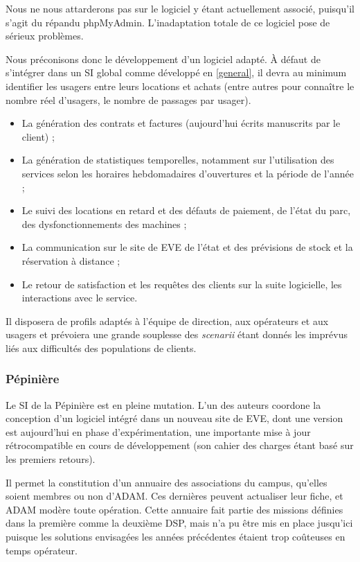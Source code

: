 Nous ne nous attarderons pas sur le logiciel y étant actuellement associé,
puisqu'il s'agit du répandu phpMyAdmin. L'inadaptation totale de ce logiciel
pose de sérieux problèmes.

Nous préconisons donc le développement d'un logiciel adapté. À défaut
de s'intégrer dans un SI global comme développé en \ref{general}, il
devra au minimum identifier les usagers entre leurs locations et achats
(entre autres pour connaître le nombre réel d'usagers, le nombre de passages
par usager).

\begin{itemize}
\item La génération des contrats et factures (aujourd'hui écrits manuscrits
      par le client) ;
\item La génération de statistiques temporelles, notamment sur l'utilisation
      des services selon les horaires hebdomadaires d'ouvertures et
      la période de l'année ;
\item Le suivi des locations en retard et des défauts de paiement, de l'état
      du parc, des dysfonctionnements des machines ;
\item La communication sur le site de EVE de l'état et des prévisions de
      stock et la réservation à distance ;
\item Le retour de satisfaction et les requêtes des clients sur la suite
      logicielle, les interactions avec le service.
\end{itemize}

Il disposera de profils adaptés à l'équipe de direction, aux opérateurs et
aux usagers et prévoiera une grande souplesse des \textit{scenarii} étant
donnés les imprévus liés aux difficultés des populations de clients.

\subsubsection{Pépinière}

Le SI de la Pépinière est en pleine mutation. L'un des auteurs coordone
la conception d'un logiciel intégré dans un nouveau site de EVE, dont une version
est aujourd'hui en phase d'expérimentation, une importante mise à jour
rétrocompatible en cours de développement (son cahier des charges étant basé
sur les premiers retours).

Il permet la constitution d'un annuaire des associations du campus, qu'elles
soient membres ou non d'ADAM. Ces dernières peuvent actualiser leur fiche,
et ADAM modère toute opération. Cette annuaire fait partie des missions définies
dans la première comme la deuxième DSP, mais n'a pu être mis en place jusqu'ici
puisque les solutions envisagées les années précédentes étaient trop coûteuses
en temps opérateur.


